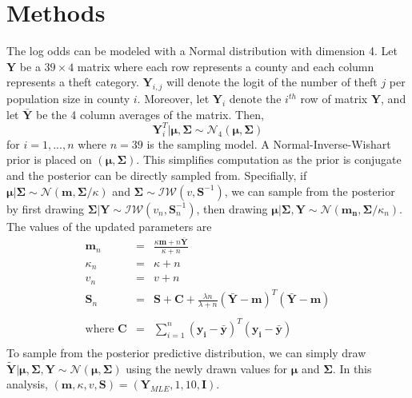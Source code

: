 \documentclass{../../tex_template/asaproc}
\newcommand{\Y}{ \bm Y }
\newcommand{\ds}{ \displaystyle }
\begin{document}
\section{Methods}
The log odds can be modeled with a Normal distribution with dimension 4.  Let
$\bm Y$ be a $39\times 4$ matrix where each row represents a county and each
column represents a theft category. $\bm Y_{i,j}$ will denote the logit of the
number of theft $j$ per population size in county $i$. Moreover, let $\bm Y_i$
denote the $i^{th}$ row of matrix $\bm Y$, and let $\bar{\bm Y}$ be the 4
column averages of the matrix.  Then,
\[
  \Y_i^T | \bm{\mu,\Sigma} \sim \mathcal{N}_4(\bm{\mu,\Sigma})
\]
for $i=1,...,n$ where $n=39$ is the sampling model. A Normal-Inverse-Wishart prior is
placed on $(\bm{\mu,\Sigma})$. This simplifies computation as the prior is
conjugate and the posterior can be directly sampled from. Specifially, if
$\bm\mu | \bm\Sigma \sim \mathcal{N}(\bm{m,\Sigma}/\kappa)$ and $\bm \Sigma
\sim \mathcal{IW}(v,\bm S^{-1})$, we can sample from the posterior by
first drawing $\bm \Sigma | \bm Y \sim \mathcal{IW}(v_n,\bm S_n^{-1})$, then 
drawing $\bm{\mu | \Sigma, Y} \sim \mathcal{N}(\bm{m_n,\Sigma}/\kappa_n)$.
The values of the updated parameters are
\[
\begin{array}{rcl}
  \bm m_n &=& \ds\frac{\kappa\bm m + n\bar{\bm Y}}{\kappa+n} \\
  \kappa_n &=& \kappa + n \\
  v_n &=& v + n \\
  \bm S_n &=& \bm{S + C} + \ds\frac{\lambda n}{\lambda+n} 
  (\boldsymbol{\bm{\bar{Y}-m}})^T(\boldsymbol{\bm{\bar{Y}-m}}) \\
  \\
  \text{where } \boldsymbol{C} &=& \sum_{i=1}^{n} (\boldsymbol{y_i-\bar{y}})^T(\boldsymbol{y_i-\bar{y}}) \\
\end{array}
\]
To sample from the posterior predictive distribution, we can simply draw
$\tilde{\bm Y} | \bm{\mu,\Sigma,Y} \sim \mathcal{N}(\bm{\mu,\Sigma})$ using the
newly drawn values for $\bm\mu$ and $\bm\Sigma$. In this analysis, $(\bm m,
\kappa, v, \bm S) = (\bm Y_{MLE},1,10, \bm I)$.
\end{document}
